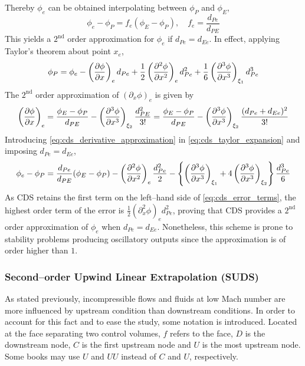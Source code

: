 \noindent
Thereby $\phi_e$ can be obtained interpolating between $\phi_P$ and $\phi_E$,
\begin{equation}
	\phi_e - \phi_P = f_e \left( \phi_E - \phi_P \right), \quad f_e = \frac{d_{Pe}}{d_{PE}}
\end{equation}
This yields a $2^{\text{nd}}$ order approximation for $\phi_e$ if $d_{Pe} = d_{Ee}$. In effect, applying Taylor's theorem about point $x_e$,
\begin{equation} \label{eq:cds_taylor_expansion}
	\phi_P = 
	\phi_e 
	- \left(\pdv{\phi}{x}\right)_e d_{Pe} 
	+ \frac{1}{2} \left(\pdv[2]{\phi}{x}\right)_e d_{Pe}^2 
	+ \frac{1}{6} \left(\pdv[3]{\phi}{x}\right)_{\xi_1} d_{Pe}^3
\end{equation}
The $2^\text{nd}$ order approximation of $(\partial_x \phi)_e$ is given by
\begin{equation} \label{eq:cds_derivative_approximation}
	\left(\pdv{\phi}{x}\right)_e = 
	\frac{\phi_E - \phi_P}{d_{PE}} - \left(\pdv[3]{\phi}{x}\right)_{\xi_2} \frac{d_{PE}^2}{3!} = 	
	\frac{\phi_E - \phi_P}{d_{PE}} - \left(\pdv[3]{\phi}{x}\right)_{\xi_2} \frac{(d_{Pe} + d_{Ee})^2}{3!}
\end{equation}
Introducing \eqref{eq:cds_derivative_approximation} in \eqref{eq:cds_taylor_expansion} and imposing $d_{Pe} = d_{Ee}$, 
\begin{equation} \label{eq:cds_error_terms}
	\phi_e - \phi_P = 
	\frac{d_{Pe}}{d_{PE}} (\phi_E - \phi_P) - 
	\left( \pdv[2]{\phi}{x} \right)_e \frac{d_{Pe}^2}{2} -
	\left\{ 
	\left( \pdv[3]{\phi}{x} \right)_{\xi_1} + 4 \left( \pdv[3]{\phi}{x} \right)_{\xi_2}
	\right\} 
	\frac{d_{Pe}^3}{6}
\end{equation}
As CDS retains the first term on the left--hand side of \eqref{eq:cds_error_terms}, the highest order term of the error is $\frac{1}{2} (\partial_x^2 \phi)_e d_{Pe}^2$, proving that CDS provides a $2^\text{nd}$ order approximation of $\phi_e$ when $d_{Pe} = d_{Ee}$. Nonetheless, this scheme is prone to stability problems producing oscillatory outputs since the approximation is of order higher than $1$.

\subsubsection{Second--order Upwind Linear Extrapolation (SUDS)}

As stated previously, incompressible flows and fluids at low Mach number are more influenced by upstream condition than downstream conditions. In order to account for this fact and to ease the study, some notation is introduced. Located at the face separating two control volumes, $f$ refers to the face, $D$ is the downstream node, $C$ is the first upstream node and $U$ is the most upstream node. Some books may use $U$ and $UU$ instead of $C$ and $U$, respectively.

